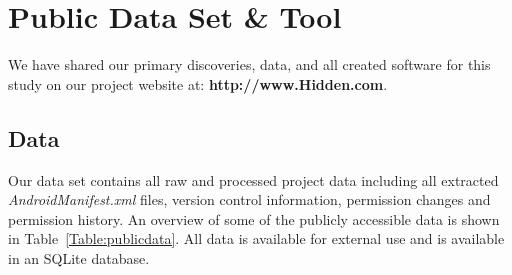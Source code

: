 \documentclass{sig-alternate-05-2015}
\begin{document}




%



%
%
%









\section{Public Data Set \& Tool}
\label{sec: publicdata}


We have shared our primary discoveries, data, and all created software for this study on our project website at: \newline \textbf{http://www.Hidden.com}.

\subsection{Data}

Our data set contains all raw and processed project data including all extracted \emph{AndroidManifest.xml} files, version control information, permission changes and permission history. An overview of some of the publicly accessible data is shown in Table~\ref{Table:publicdata}. All data is available for external use and is available in an SQLite database.
\end{document}
